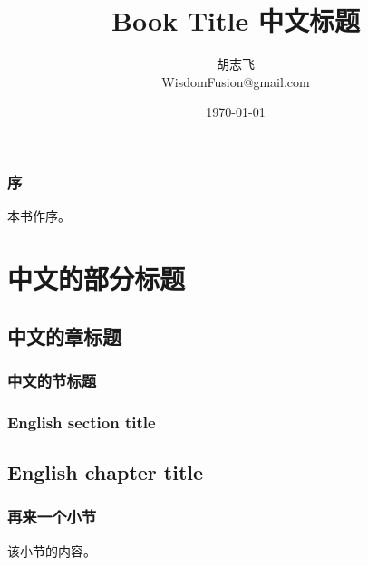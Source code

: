 \documentclass{ctexbook}
\title{\Huge \textbf{Book Title 中文标题}}
\author{\Large{胡志飞} \\ WisdomFusion@gmail.com}
\date{\today}
\begin{document}
\maketitle
\thispagestyle{empty}

\frontmatter

\section*{序}

本书作序。

\clearpage\thispagestyle{empty}

\tableofcontents
\clearpage\thispagestyle{empty}


\mainmatter

\part{中文的部分标题}

\chapter{中文的章标题}

\lipsum[3]


\section{中文的节标题}

\lipsum[3]


\section{English section title}

\lipsum[2-5]

\chapter{English chapter title}

\section{再来一个小节}

该小节的内容。
\end{document}
